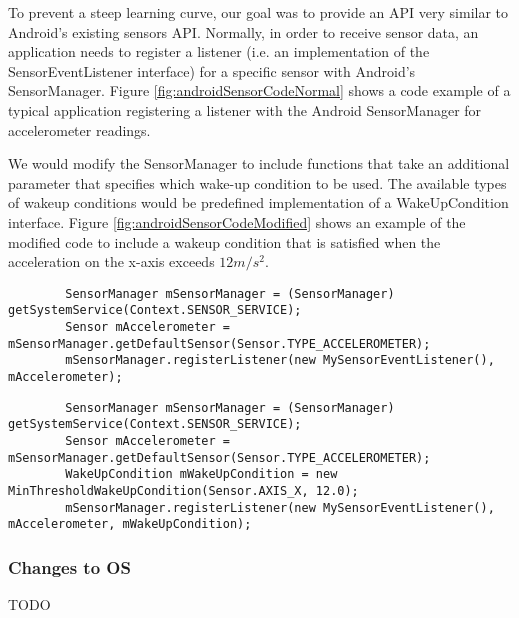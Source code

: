 To prevent a steep learning curve, our goal was to provide an API very similar to Android's existing sensors API. Normally, in order to receive sensor data, an application needs to register a listener (i.e. an implementation of the SensorEventListener interface) for a specific sensor with Android's SensorManager. Figure \ref{fig:androidSensorCodeNormal} shows a code example of a typical application registering a listener with the Android SensorManager for accelerometer readings.

We would modify the SensorManager to include functions that take an additional parameter that specifies which wake-up condition to be used. The available types of wakeup conditions would be predefined implementation of a WakeUpCondition interface. Figure \ref{fig:androidSensorCodeModified} shows an example of the modified code to include a wakeup condition that is satisfied when the acceleration on the x-axis exceeds $12 m/s^2$.

\begin{figure*}[t]
	\begin{verbatim}
		SensorManager mSensorManager = (SensorManager) getSystemService(Context.SENSOR_SERVICE);
		Sensor mAccelerometer = mSensorManager.getDefaultSensor(Sensor.TYPE_ACCELEROMETER);
		mSensorManager.registerListener(new MySensorEventListener(), mAccelerometer);
	\end{verbatim}
	\caption{Typical usage of Android's SensorManager}
    \label{fig:androidSensorCodeNormal}
\end{figure*}

\begin{figure*}[t]
	\begin{verbatim}
		SensorManager mSensorManager = (SensorManager) getSystemService(Context.SENSOR_SERVICE);
		Sensor mAccelerometer = mSensorManager.getDefaultSensor(Sensor.TYPE_ACCELEROMETER);
		WakeUpCondition mWakeUpCondition = new MinThresholdWakeUpCondition(Sensor.AXIS_X, 12.0);
		mSensorManager.registerListener(new MySensorEventListener(), mAccelerometer, mWakeUpCondition);
	\end{verbatim}
	\caption{Usage of the SensorManager with a wakeup condition}
    \label{fig:androidSensorCodeModified}
\end{figure*}

\subsubsection{Changes to OS}

TODO

